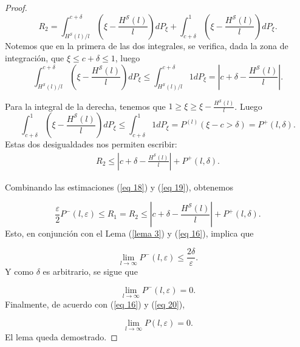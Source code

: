 \documentclass{report}
\begin{document}
\begin{proof}
    \begin{equation*}
        R_2 =  \int_{H^{\mathcal{S}}(l)/l}^{c + \delta} \left( \xi - \frac{H^{\mathcal{S}}(l)}{l} \right) dP_{\xi}
        + \int_{c + \delta}^{1} \left( \xi - \frac{H^{\mathcal{S}}(l)}{l} \right) dP_{\xi}.
    \end{equation*}
    Notemos que en la primera de las dos integrales, se verifica, dada la zona de integración, que \(\xi \leq c+\delta \leq 1\),
    luego
    \[
        \int_{H^{\mathcal{S}}(l)/l}^{c + \delta} \left( \xi - \frac{H^{\mathcal{S}}(l)}{l} \right) dP_{\xi}
        \leq \int_{H^{\mathcal{S}}(l)/l}^{c + \delta} 1 dP_{\xi}
        = \left| c + \delta -  \frac{H^{\mathcal{S}}(l)}{l} \right|.
    \]

    Para la integral de la derecha, tenemos que $1\geq\xi\geq \xi-\frac{H^{\mathcal{S}}(l)}{l}$. Luego
    \[
        \int_{c + \delta}^{1} \left( \xi - \frac{H^{\mathcal{S}}(l)}{l} \right) dP_{\xi}
        \leq \int_{c + \delta}^{1} 1 dP_{\xi} = P^{(l)}(\xi-c>\delta) = P^+(l, \delta).
    \]
    Estas dos desigualdades nos permiten escribir:
    \begin{equation}\label{eq 19}
        \begin{aligned}
          R_2\leq \left| c + \delta - \frac{H^{\mathcal{S}}(l)}{l} \right| + P^+(l, \delta).
        \end{aligned}
    \end{equation}

    Combinando las estimaciones (\ref{eq 18}) y (\ref{eq 19}), obtenemos

    \begin{equation}
       \frac{\varepsilon}{2} P^-(l, \varepsilon) \leq R_1 = R_2 \leq \left| c + \delta - \frac{H^{\mathcal{S}}(l)}{l} \right| + P^+(l, \delta).
    \end{equation}
    Esto, en conjunción con el Lema (\ref{lema 3}) y (\ref{eq 16}), implica que

    \begin{equation*}
    \lim_{l \to \infty} P^-(l, \varepsilon) \leq \frac{2\delta}{\varepsilon}.
    \end{equation*}
    Y como \( \delta \) es arbitrario, se sigue que

    \begin{equation}\label{eq 20}
    \lim_{l \to \infty} P^-(l, \varepsilon) = 0.
    \end{equation}
    Finalmente, de acuerdo con (\ref{eq 16}) y (\ref{eq 20}),

    \begin{equation*}
    \lim_{l \to \infty} P(l, \varepsilon) = 0.
    \end{equation*}
    El lema queda demostrado.
\end{proof}
\bigskip
\end{document}
